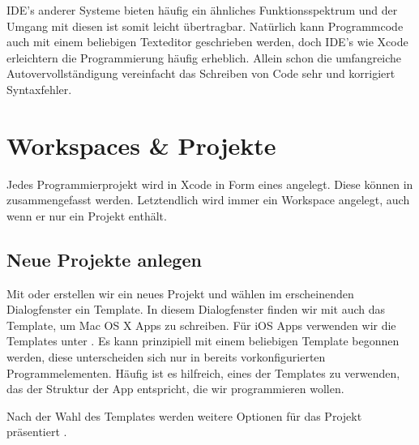 \documentclass[parskip=half, final]{scrreprt}
\begin{document}
IDE's anderer Systeme bieten häufig ein ähnliches Funktionsspektrum und der Umgang mit diesen ist somit leicht übertragbar. Natürlich kann Programmcode auch mit einem beliebigen Texteditor geschrieben werden, doch IDE's wie Xcode erleichtern die Programmierung häufig erheblich. Allein schon die umfangreiche Autovervollständigung vereinfacht das Schreiben von Code sehr und korrigiert Syntaxfehler.

\section{Workspaces \& Projekte}

Jedes Programmierprojekt wird in Xcode in Form eines  angelegt. Diese können in  zusammengefasst werden. Letztendlich wird immer ein Workspace angelegt, auch wenn er nur ein Projekt enthält.

\subsection{Neue Projekte anlegen}

Mit  oder  erstellen wir ein neues Projekt und wählen im erscheinenden Dialogfenster  ein Template. In diesem Dialogfenster finden wir mit  auch das Template, um Mac OS X Apps zu schreiben. Für iOS Apps verwenden wir die Templates unter . Es kann prinzipiell mit einem beliebigen Template begonnen werden, diese unterscheiden sich nur in bereits vorkonfigurierten Programmelementen. Häufig ist es hilfreich, eines der Templates zu verwenden, das der Struktur der App entspricht, die wir programmieren wollen.


Nach der Wahl des Templates werden weitere Optionen für das Projekt präsentiert .

\end{document}
